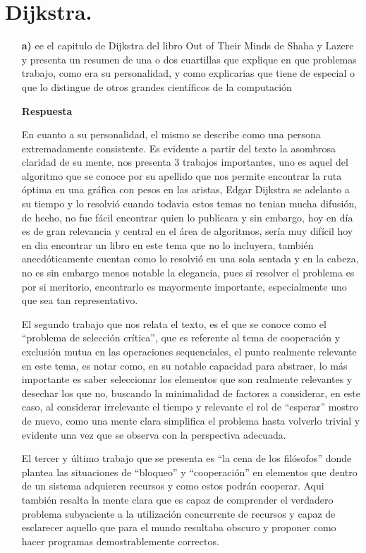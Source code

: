 \documentclass[12pt]{article}
\begin{document}
\section{Dijkstra.}
\begin{itemize}

  \item[\bf{a)}]
ee el capitulo de Dijkstra del libro Out of Their Minds de Shaha y Lazere y presenta
un resumen de una o dos cuartillas que explique en que problemas trabajo, como era
su personalidad, y como explicarias que tiene de especial o que lo distingue de otros
grandes científicos de la computación

  \item[\bf{Respuesta}]

En cuanto a su personalidad, el mismo se describe como una persona extremadamente consistente. Es evidente a partir del texto la asombrosa claridad de su mente, nos presenta 3 trabajos importantes, uno es aquel del algoritmo que se conoce por su apellido que nos permite encontrar la ruta óptima en una gráfica con pesos en las aristas,  Edgar Dijkstra se adelanto a su tiempo y lo resolvió cuando todavia estos temas no tenian mucha difusión, de hecho, no fue fácil encontrar quien lo publicara y sin embargo, hoy en día es de gran relevancia y central en el área de algoritmos, sería muy difícil hoy en dia encontrar un libro en este tema que no lo incluyera, también anecdóticamente cuentan como lo resolvió en una sola sentada y en la cabeza, no es sin embargo menos notable la elegancia, pues si resolver el problema es por si meritorio, encontrarlo es mayormente importante, especialmente uno que sea tan representativo.

El segundo trabajo que nos relata el texto, es el que se conoce como el ``problema de selección crítica'', que es referente al tema de cooperación y exclusión mutua en las operaciones sequenciales, el punto realmente relevante en este tema, es notar como, en su notable capacidad para abstraer, lo más importante es saber seleccionar los elementos que son realmente relevantes y desechar los que no, buscando la minimalidad de factores a considerar, en este caso, al considerar irrelevante el tiempo y relevante el rol de ``esperar'' mostro de nuevo, como una mente clara simplifica el problema hasta volverlo trivial y evidente una vez que se observa con la perspectiva adecuada.

El tercer y último trabajo que se presenta es  ``la cena de los filósofos'' donde plantea las situaciones de ``bloqueo'' y ``cooperación'' en elementos que dentro de un sistema adquieren recursos y como estos podrán cooperar. Aqui también resalta la mente clara que es capaz de comprender el verdadero problema subyaciente a la utilización concurrente de recursos  y capaz de esclarecer aquello que para el mundo resultaba obscuro y proponer como hacer programas demostrablemente correctos.


\end{itemize}
\end{document}
